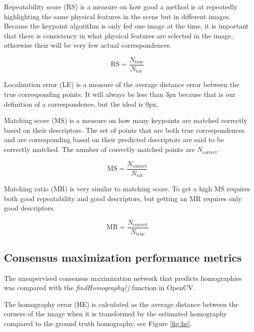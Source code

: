 Repeatability score (RS) is a measure on how good a method is at repeatedly highlighting the same physical features in the scene but in different images. Because the keypoint algorithm is only fed one image at the time, it is important that there is consistency in what physical features are selected in the image, otherwise their will be very few actual correspondences.

\begin{equation}
\mathrm{RS} = \frac{N_{\mathrm{true}}}{N_{\mathrm{tot}}} 
\end{equation}

Localization error (LE) is a measure of the average distance error between the true corresponding points. It will always be less than 3px because that is our definition of a correspondence, but the ideal is 0px.


Matching score (MS) is a measure on how many keypoints are matched correctly based on their descriptors. The set of points that are both true correspondences and are corresponding based on their predicted descriptors are said to be correctly matched. The number of correctly matched points are $N_{\mathrm{correct}}$.

\begin{equation}
\mathrm{MS}=\frac{N_{\mathrm{correct}}}{N_{\mathrm{tot}}}
\end{equation}

Matching ratio (MR) is very similar to matching score. To get a high MS requires both good repeatability and good descriptors, but getting an MR requires only good descriptors.

\begin{equation}
\mathrm{MR}=\frac{N_{\mathrm{correct}}}{N_{\mathrm{true}}}
\end{equation}

\subsection{Consensus maximization performance metrics}\label{sec:consensusmetrics}

The unsupervised consensus maximization network that predicts homographies was compared with the \textit{findHomography()} function in OpenCV.

The homography error (HE) is calculated as the average distance between the corners of the image when it is transformed by the estimated homography compared to the ground truth homography, see Figure \ref{fig:he}.

